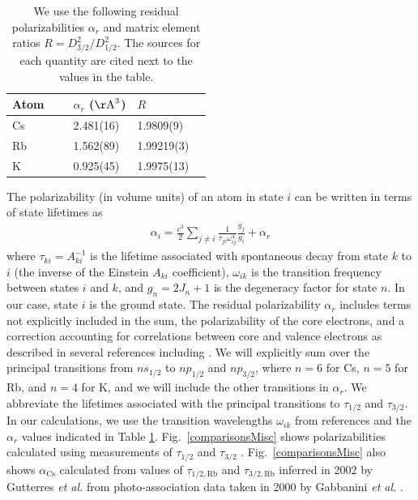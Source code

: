 \documentclass[twocolumn,prl,showpacs,superscriptaddress,longbibliography]{revtex4-1}   %
\newcommand{\figref}[1]{Fig.~\ref{#1}}
\newcommand{\acs}{\alpha_{\textrm{Cs}}}
\newcommand{\etalspace}{\textit{et al. }}
\newcommand{\AAA}{\mathrm{\AA}}
\begin{document}
\begingroup
\begin{table}
\caption{\label{tableOmegaRes}We use the following residual polarizabilities $\alpha_r$ and matrix element ratios $R = D_{3/2}^2/D_{1/2}^2$.
The sources for each quantity are cited next to the values in the table.}
\begin{center}
\begin{tabular}{llll}
\hline\hline
Atom$\quad$~ & $\alpha_r$ ($\AAA^3$) \quad\quad\quad\quad\quad & $R$ \\
\hline
Cs & 2.481(16) \cite{Derevianko2001} & 1.9809(9) & \cite{Rafac1998} \\
Rb & 1.562(89) \cite{Safronova2006} & 1.99219(3) & \cite{Leonard2015} \\
K  & 0.925(45) \cite{Safronova2006} & 1.9975(13) & \cite{Trubko2015} \\
\hline\hline
\end{tabular}
\end{center}
\end{table}
\endgroup

The polarizability (in volume units) of an atom in state $i$ can be written in terms of state lifetimes as
\begin{align}
	\alpha_i = \frac{c^3}{2} \sum_{j\neq i} 
	\frac{1}{\tau_{ji} \omega_{ij}^4} \frac{g_j}{g_i}
	+ \alpha_r
	\label{polFromLifetimes}
\end{align}
where $\tau_{ki} = A_{ki}^{-1}$ is the lifetime associated with spontaneous decay from state $k$ to $i$ (the inverse of the Einstein $A_{ki}$ coefficient),  $\omega_{ik}$ is the transition frequency between states $i$ and $k$, and $g_n = 2J_n+1$ is the degeneracy factor for state $n$. In our case, state $i$ is the ground state. The residual polarizability $\alpha_r$ includes terms not explicitly included in the sum, the polarizability of the core electrons, and a correction accounting for correlations between core and valence electrons as described in several references including 
\cite{Derevianko1998, Derevianko2001, Safronova2006}.  We will explicitly sum over the principal transitions from $ns_{1/2}$ to $np_{1/2}$ and $np_{3/2}$, where $n=6$ for Cs, $n=5$ for Rb, and $n=4$ for K, and we will include the other transitions in $\alpha_r$. We abbreviate the lifetimes associated with the principal transitions to $\tau_{1/2}$ and $\tau_{3/2}$. In our calculations, we use the transition wavelengths $\omega_{ik}$ from references
\cite{Gerginov2005, Gerginov2006, Falke2006, Johansson1961}
and the $\alpha_r$ values indicated in Table \ref{tableOmegaRes}.
\figref{comparisonsMisc} shows polarizabilities calculated using measurements of $\tau_{1/2}$ and $\tau_{3/2}$
\cite{Young1994,Rafac1999,Bouloufa2007,Falke2006a,Volz2006,Simsarian1998,Wang1997}.
\figref{comparisonsMisc} also shows $\acs$ calculated from
values of $\tau_{1/2,\mathrm{Rb}}$ and $\tau_{3/2,\mathrm{Rb}}$ inferred in 2002 by Gutterres \etalspace from photo-association data taken in 2000 by Gabbanini \etalspace \cite{Gabbanini2000,Gutterres2002}.
\end{document}
